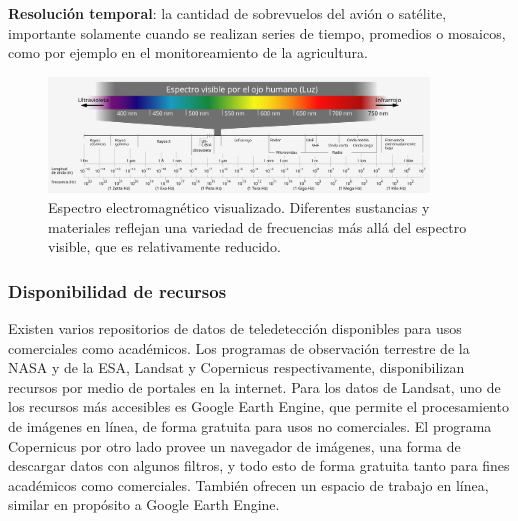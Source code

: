 {\bf Resolución temporal}: la cantidad de sobrevuelos del avión o satélite, importante solamente cuando se realizan
series de tiempo, promedios o mosaicos, como por ejemplo en el monitoreamiento de la agricultura.

\begin{figure}
    \centering
    \includegraphics[width=0.9\textwidth]{img/Electromagnetic_spectrum-es.svg.png}
    \caption{Espectro electromagnético visualizado. Diferentes sustancias y materiales reflejan una variedad de
    frecuencias más allá del espectro visible, que es relativamente reducido.}
    \label{fig:3}
\end{figure}

\subsubsection{Disponibilidad de recursos}

Existen varios repositorios de datos de teledetección disponibles para usos comerciales como académicos. Los programas
de observación terrestre de la NASA y de la ESA, Landsat y Copernicus respectivamente, disponibilizan recursos por
medio de portales en la internet. Para los datos de Landsat, uno de los recursos más accesibles es Google Earth Engine,
que permite el procesamiento de imágenes en línea, de forma gratuita para usos no comerciales.
\autocite{landsat-data-access} El programa Copernicus por otro lado provee un navegador de imágenes, una forma de
descargar datos con algunos filtros, y todo esto de forma gratuita tanto para fines académicos como comerciales.
\autocite{copernicus-licences} También ofrecen un espacio de trabajo en línea, similar en propósito a Google Earth
Engine. \autocite{copernicus-ds-about}
